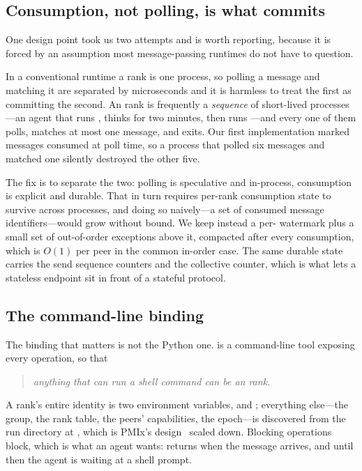 \subsection{Consumption, not polling, is what commits}

One design point took us two attempts and is worth reporting, because it is
forced by an assumption most message-passing runtimes do not have to
question.

In a conventional runtime a rank is one process, so polling a message and
matching it are separated by microseconds and it is harmless to treat the
first as committing the second. An \ampi{} rank is frequently a
\emph{sequence} of short-lived processes---an agent that runs , thinks for two minutes, then runs ---and every one of
them polls, matches at most one message, and exits. Our first implementation
marked messages consumed at poll time, so a process that polled six messages
and matched one silently destroyed the other five.

The fix is to separate the two: polling is speculative and in-process,
consumption is explicit and durable. That in turn requires per-rank
consumption state to survive across processes, and doing so naively---a set
of consumed message identifiers---would grow without bound. We keep instead
a per- watermark plus a small set of
out-of-order exceptions above it, compacted after every consumption, which
is $O(1)$ per peer in the common in-order case. The same durable state
carries the send sequence counters and the collective counter, which is what
lets a stateless endpoint sit in front of a stateful protocol.

\subsection{The command-line binding}

The binding that matters is not the Python one.  is a
command-line tool exposing every operation, so that

\begin{quote}
\emph{anything that can run a shell command can be an \ampi{} rank.}
\end{quote}

A rank's entire identity is two environment variables,  and
; everything else---the group, the rank table, the peers'
capabilities, the epoch---is discovered from the run directory at
, which is PMIx's design~\cite{castain2018pmix} scaled down.
Blocking operations block, which is what an agent wants: 
returns when the message arrives, and until then the agent is waiting at a
shell prompt.

